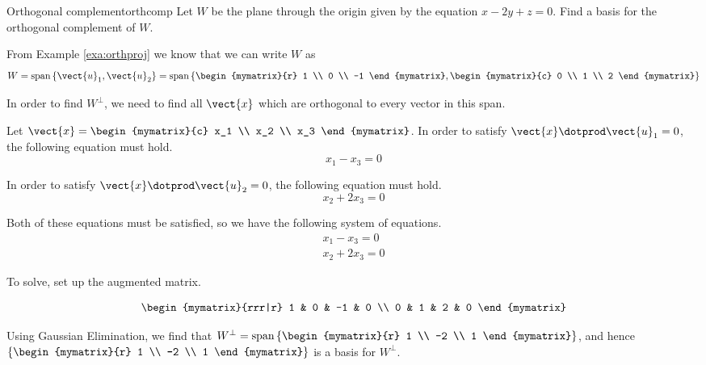 \begin{example}{Orthogonal complement}{orthcomp}
Let $W$ be the  plane through the origin given by the equation  $x - 2y + z = 0$. Find
a basis for the orthogonal complement of $W$.
\end{example}

\begin{solution}

From Example \ref{exa:orthproj} we know that we can write $W$ as 
\[
W = \mbox{span} \left\{ \vect{u}_1, \vect{u}_2 \right\} = \mbox{span} 
\left\{
\begin{mymatrix}{r}
1 \\
0 \\
-1
\end{mymatrix},
\begin{mymatrix}{c}
0 \\
1 \\
2
\end{mymatrix}
\right\}
\]

In order to find $W^{\perp}$, we need to find all $\vect{x}$ which are orthogonal to every vector in this span. 

Let $\vect{x} = \begin{mymatrix}{c}
x_1 \\
x_2 \\
x_3
\end{mymatrix}$. 
In order to satisfy $\vect{x} \dotprod \vect{u}_1 = 0$, the following equation must hold. 
\[
x_1 - x_3 = 0
\]

In order to satisfy $\vect{x} \dotprod \vect{u}_2 = 0$, the following equation must hold.
\[
x_2 + 2x_3 = 0 
\]

Both of these equations must be satisfied, so we have the following system of equations. 
\[
\begin{array}{c}
x_1 - x_3 = 0 \\
x_2 + 2x_3 = 0
\end{array}
\]

To solve, set up the augmented matrix. 

\[
\begin{mymatrix}{rrr|r}
1 & 0 & -1 & 0 \\
0 & 1 & 2 & 0 
\end{mymatrix}
\]

Using Gaussian Elimination, we find that $W^{\perp} = \mbox{span} \left\{ \begin{mymatrix}{r}
1 \\
-2 \\
1
\end{mymatrix}
\right\}$, and hence 
$\left\{ \begin{mymatrix}{r}
1 \\
-2 \\
1
\end{mymatrix}
\right\}$ is a basis for  $W^{\perp}$. 
\end{solution}

